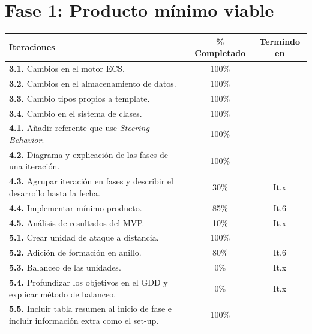 \newpage

\section{Fase 1: Producto mínimo viable}

\begin{longtable}[c]{|p{7cm}|c|c|}
\hline
Iteraciones                                               & \% Completado & Termindo en \\ 
\hline
\textbf{3.1.} Cambios en el motor ECS.                     & 100\% &   \\
	\cmidrule[.003pt]{1-3}
\textbf{3.2.} Cambios en el almacenamiento de datos.       & 100\% &   \\ 
	\cmidrule[.003pt]{1-3}
\textbf{3.3.} Cambio tipos propios a template.             & 100\% &   \\ 
	\cmidrule[.003pt]{1-3}
\textbf{3.4.} Cambio en el sistema de clases.              & 100\% &   \\
	
	\cmidrule[1pt]{1-3}

\textbf{4.1.} Añadir referente que use 
				\textit{Steering Behavior}.                & 100\% &   \\
	\cmidrule[.003pt]{1-3}
\textbf{4.2.} Diagrama y explicación de las fases de 
				una iteración.                             & 100\% &   \\
	\cmidrule[.003pt]{1-3}
\textbf{4.3.} Agrupar iteración en fases y describir el
				desarrollo hasta la fecha.                 & 30\%  &  It.x \\
	\cmidrule[.003pt]{1-3}
\textbf{4.4.} Implementar mínimo producto.                 & 85\%  &  It.6 \\
	\cmidrule[.003pt]{1-3}
\textbf{4.5.} Análisis de resultados del MVP.              & 10\%  &  It.x \\
	
	\cmidrule[1pt]{1-3}
	
\textbf{5.1.} Crear unidad de ataque a distancia.          & 100\% &   \\
	\cmidrule[.003pt]{1-3}
\textbf{5.2.} Adición de formación en anillo.              & 80\%  &  It.6 \\ 
	\cmidrule[.003pt]{1-3}
\textbf{5.3.} Balanceo de las unidades.                    & 0\%   &  It.x \\ 
	\cmidrule[.003pt]{1-3}		
\textbf{5.4.} Profundizar los objetivos en el GDD y 
				explicar método de balanceo.               & 0\%   &  It.x \\ 
	\cmidrule[.003pt]{1-3}		
\textbf{5.5.} Incluir tabla resumen al inicio de fase
				e incluir información extra como el set-up.& 100\%  &  \\


\end{longtable}
